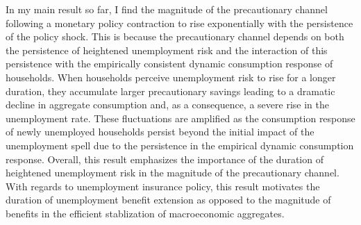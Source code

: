 \documentclass[titlepage]{\econtex}\providecommand{\texname}{Dissertation-Proposal}
\begin{document}
 
In my main result so far, I find the magnitude of the precautionary channel following a monetary policy contraction to rise exponentially with the persistence of the policy shock. This is because the precautionary channel depends on both the persistence of heightened unemployment risk and the interaction of this persistence with the empirically consistent dynamic consumption response of households. When households perceive unemployment risk to rise for a longer duration, they accumulate larger precautionary savings leading to a dramatic decline in aggregate consumption and, as a consequence, a severe rise in the unemployment rate. These fluctuations are amplified as the consumption response of newly unemployed households persist beyond the initial impact of the unemployment spell due to the persistence in the empirical dynamic consumption response. Overall, this result emphasizes the importance of the duration of heightened unemployment risk in the magnitude of the precautionary channel. With regards to unemployment insurance policy, this result motivates the duration of unemployment benefit extension as opposed to the magnitude of benefits in the efficient stablization of macroeconomic aggregates. \\










 
 
\end{document}

